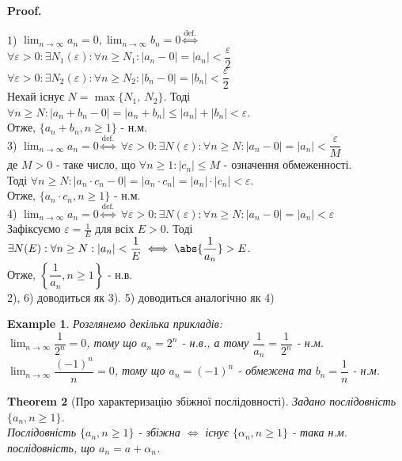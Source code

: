 \documentclass[a4paper, 14pt]{article}
\makeatletter
\def\qed{$\blacksquare$}
\theoremstyle{theoremdd}
\newtheorem{theorem}{Theorem}[subsection]
\theoremstyle{theoremdd}
\theoremstyle{theoremdd}
\theoremstyle{theoremdd}
\newtheorem{example}[theorem]{Example}
\theoremstyle{theoremdd}
\theoremstyle{theoremdd}
\theoremstyle{theoremdd}
\theoremstyle{theoremdd}
\renewenvironment{proof}[1][Proof.\\]{\par
\pushQED{\hfill \qed}%
\normalfont \topsep6\p@\@plus6\p@\relax
\trivlist
\item\relax
{\bfseries
#1\@addpunct{.}}\hspace\labelsep\ignorespaces
}{%
\popQED\endtrivlist\@endpefalse
}
\makeatother
\begin{document}
	\begin{proof}
	1) $\displaystyle \lim_{n \to \infty} a_n = 0, \lim_{n \to \infty} b_n = 0 \overset{\textrm{def.}}{\iff}$\\
	$\forall \varepsilon > 0: \exists N_1(\varepsilon): \forall n \geq N_1: |a_n-0| = |a_n| < \dfrac{\varepsilon}{2}$\\
	$\forall \varepsilon > 0: \exists N_2(\varepsilon): \forall n \geq N_2: |b_n-0| = |b_n| < \dfrac{\varepsilon}{2}$\\
	Нехай існує $N=\max\{N_1, \ N_2\}$. Тоді $\forall n \geq N: |a_n+b_n - 0| = |a_n+b_n| \leq |a_n|+|b_n| < \varepsilon$.\\
	Отже, $\{a_n+b_n, n \geq 1\}$ - н.м.
	\bigskip \\
	3) $\displaystyle \lim_{n \to \infty} a_n = 0 \overset{\textrm{def.}}{\iff}$ $\forall \varepsilon > 0: \exists N(\varepsilon): \forall n \geq N: |a_n-0| = |a_n| < \dfrac{\varepsilon}{M}$\\
	де $M>0$ - таке число, що $\forall n \geq 1: |c_n| \leq M$ - означення обмеженності.\\
	Тоді $\forall n \geq N: |a_n \cdot c_n - 0| = |a_n \cdot c_n| = |a_n| \cdot |c_n| < \varepsilon$.\\
	Отже, $\{a_n \cdot c_n, n \geq 1 \}$ - н.м.
	\bigskip \\
	4) $\displaystyle \lim_{n \to \infty} a_n = 0 \overset{\textrm{def.}}{\iff}$ $\forall \varepsilon > 0: \exists N(\varepsilon): \forall n \geq N: |a_n-0| = |a_n| < \varepsilon$\\
	Зафіксуємо $\displaystyle \varepsilon = \frac{1}{E}$ для всіх $E>0$. Тоді $\displaystyle \exists N(E): \forall n \geq N: |a_n|<\frac{1}{E} \iff \abs{\frac{1}{a_n}} > E$.\\
	Отже, $\left\{ \dfrac{1}{a_n}, n \geq 1 \right\}$ - н.в.
	\bigskip \\
	2), 6) доводиться як 3). 5) доводиться аналогічно як 4)
	\end{proof}
	
	\begin{example}
	Розглянемо декілька прикладів:\\
	$\displaystyle\lim_{n \to \infty} \dfrac{1}{2^n} = 0$, тому що $a_n = 2^n$ - н.в., а тому $\dfrac{1}{a_n} = \dfrac{1}{2^n}$ - н.м.\\
	$\displaystyle\lim_{n \to \infty} \dfrac{(-1)^n}{n} = 0$, тому що $a_n = (-1)^n$ - обмежена та $b_n = \dfrac{1}{n}$ - н.м.
	\end{example}
	
	\begin{theorem}[Про характеризацію збіжної послідовності]
	Задано послідовність $\{a_n, n \geq 1\}$.\\
	Послідовність $\{a_n, n \geq 1\}$ - збіжна $\iff$ існує $\{\alpha_n, n \geq 1\}$ - така н.м. послідовність, що $a_n = a+\alpha_n$.
	\end{theorem}
	
\end{document}
